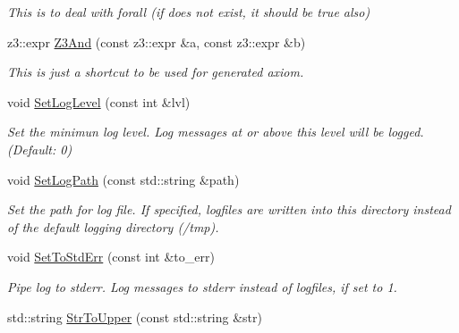 \begin{DoxyCompactItemize}
\begin{DoxyCompactList}\small\item\em This is to deal with forall (if does not exist, it should be true also) \end{DoxyCompactList}\item 
\mbox{\label{namespaceilang_a181bcd7690eed0466a301469995543a4}} 
z3\+::expr \mbox{\hyperlink{namespaceilang_a181bcd7690eed0466a301469995543a4}{Z3\+And}} (const z3\+::expr \&a, const z3\+::expr \&b)
\begin{DoxyCompactList}\small\item\em This is just a shortcut to be used for generated axiom. \end{DoxyCompactList}\item 
void \mbox{\hyperlink{namespaceilang_ad5002dc8078f121ff03b282d1637b4c0}{Set\+Log\+Level}} (const int \&lvl)
\begin{DoxyCompactList}\small\item\em Set the minimun log level. Log messages at or above this level will be logged. (Default\+: 0) \end{DoxyCompactList}\item 
\mbox{\label{namespaceilang_a4ad694e631ce9de3140f3d3991f87728}} 
void \mbox{\hyperlink{namespaceilang_a4ad694e631ce9de3140f3d3991f87728}{Set\+Log\+Path}} (const std\+::string \&path)
\begin{DoxyCompactList}\small\item\em Set the path for log file. If specified, logfiles are written into this directory instead of the default logging directory (/tmp). \end{DoxyCompactList}\item 
\mbox{\label{namespaceilang_a297a8bf42d97a385aa18916321c6bce6}} 
void \mbox{\hyperlink{namespaceilang_a297a8bf42d97a385aa18916321c6bce6}{Set\+To\+Std\+Err}} (const int \&to\+\_\+err)
\begin{DoxyCompactList}\small\item\em Pipe log to stderr. Log messages to stderr instead of logfiles, if set to 1. \end{DoxyCompactList}\item 
\mbox{\label{namespaceilang_a0991fc567e0acf208e32077bfa58c0e8}} 
std\+::string \mbox{\hyperlink{namespaceilang_a0991fc567e0acf208e32077bfa58c0e8}{Str\+To\+Upper}} (const std\+::string \&str)

\end{DoxyCompactItemize}
